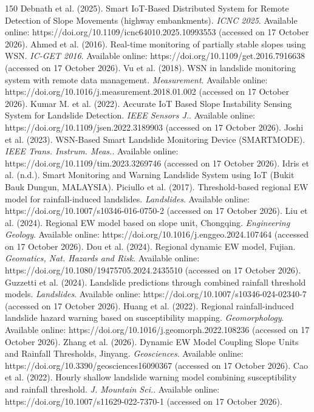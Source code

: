 \begin{thebibliography}{150}
Debnath et al. (2025). Smart IoT-Based Distributed System for Remote Detection of Slope Movements (highway embankments). \textit{ICNC 2025}. Available online: https://doi.org/10.1109/icnc64010.2025.10993553 (accessed on 17 October 2026).
Ahmed et al. (2016). Real-time monitoring of partially stable slopes using WSN. \textit{IC-GET 2016}. Available online: https://doi.org/10.1109/get.2016.7916638 (accessed on 17 October 2026).
Vu et al. (2018). WSN in landslide monitoring system with remote data management. \textit{Measurement}. Available online: https://doi.org/10.1016/j.measurement.2018.01.002 (accessed on 17 October 2026).
Kumar M. et al. (2022). Accurate IoT Based Slope Instability Sensing System for Landslide Detection. \textit{IEEE Sensors J.}. Available online: https://doi.org/10.1109/jsen.2022.3189903 (accessed on 17 October 2026).
Joshi et al. (2023). WSN-Based Smart Landslide Monitoring Device (SMARTMODE). \textit{IEEE Trans. Instrum. Meas.}. Available online: https://doi.org/10.1109/tim.2023.3269746 (accessed on 17 October 2026).
Idris et al. (n.d.). Smart Monitoring and Warning Landslide System using IoT (Bukit Bauk Dungun, MALAYSIA).
Piciullo et al. (2017). Threshold-based regional EW model for rainfall-induced landslides. \textit{Landslides}. Available online: https://doi.org/10.1007/s10346-016-0750-2 (accessed on 17 October 2026).
Liu et al. (2024). Regional EW model based on slope unit, Chongqing. \textit{Engineering Geology}. Available online: https://doi.org/10.1016/j.enggeo.2024.107464 (accessed on 17 October 2026).
Dou et al. (2024). Regional dynamic EW model, Fujian. \textit{Geomatics, Nat. Hazards and Risk}. Available online: https://doi.org/10.1080/19475705.2024.2435510 (accessed on 17 October 2026).
Guzzetti et al. (2024). Landslide predictions through combined rainfall threshold models. \textit{Landslides}. Available online: https://doi.org/10.1007/s10346-024-02340-7 (accessed on 17 October 2026).
Huang et al. (2022). Regional rainfall-induced landslide hazard warning based on susceptibility mapping. \textit{Geomorphology}. Available online: https://doi.org/10.1016/j.geomorph.2022.108236 (accessed on 17 October 2026).
Zhang et al. (2026). Dynamic EW Model Coupling Slope Units and Rainfall Thresholds, Jinyang. \textit{Geosciences}. Available online: https://doi.org/10.3390/geosciences16090367 (accessed on 17 October 2026).
Cao et al. (2022). Hourly shallow landslide warning model combining susceptibility and rainfall threshold. \textit{J. Mountain Sci.}. Available online: https://doi.org/10.1007/s11629-022-7370-1 (accessed on 17 October 2026).

\end{thebibliography}
